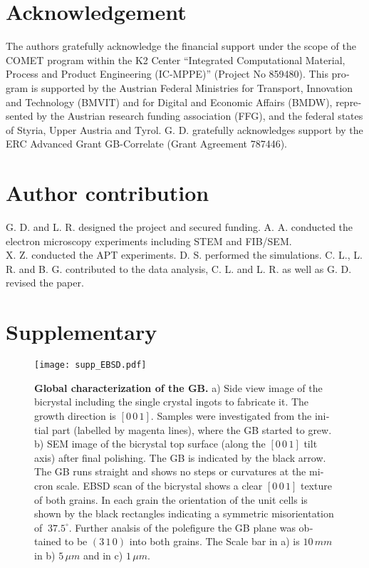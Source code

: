 \documentclass[12pt,a4paper,twoside,twocolumn,english,english]{article}
\newcommand{\beginsupplement}{%
        \setcounter{table}{0}
        \renewcommand{\thetable}{S\arabic{table}}%
        \setcounter{figure}{0}
        \renewcommand{\thefigure}{S\arabic{figure}}%
     }
\begin{document}
\begin{otherlanguage}{english}
\section*{Acknowledgement}
The authors gratefully acknowledge the financial support under the scope of the COMET program within the K2 Center “Integrated Computational Material, Process and Product Engineering (IC-MPPE)” (Project No 859480). This program is supported by the Austrian Federal Ministries for Transport, Innovation and Technology (BMVIT) and for Digital and Economic Affairs (BMDW), represented by the Austrian research funding association (FFG), and the federal states of Styria, Upper Austria and Tyrol. G. D. gratefully acknowledges support by the ERC Advanced Grant GB-Correlate (Grant Agreement 787446).

\section*{Author contribution}
G. D. and L. R. designed the project and secured funding. A. A. conducted the electron microscopy experiments including STEM and FIB/SEM.\\ X. Z. conducted the APT experiments. D. S. performed the simulations. C. L., L. R. and B. G. contributed to the data analysis, C. L. and L. R. as well as G. D. revised the paper.

\newpage
\beginsupplement
\section*{Supplementary}\label{supplementary}

\begin{figure*}[htbp]
\texttt{[image: supp\_EBSD.pdf]}
\caption{\textbf{Global characterization of the GB.} a) Side view image of the bicrystal including the single crystal ingots to fabricate it. The growth direction is $[0\,0\,1]$. Samples were investigated from the initial part (labelled by magenta lines), where the GB started to grew. b) SEM image of the bicrystal top surface (along the $[0\,0\,1]$ tilt axis) after final polishing. The GB is indicated by the black arrow. The GB runs straight and shows no steps or curvatures at the micron scale. EBSD scan of the bicrystal shows a clear $[0\,0\,1]$ texture of both grains. In each grain the orientation of the unit cells is shown by the black rectangles indicating a symmetric misorientation of $~37.5^\circ$. Further analsis of the polefigure the GB plane was obtained to be $(3\,1\,0)$ into both grains. The Scale bar in a) is $10\,m m$ in b) $5\,\mu m$ and in c) $1\,\mu m$.}
\label{supp:EBSD}
\end{figure*}


\end{otherlanguage}
\end{document}
